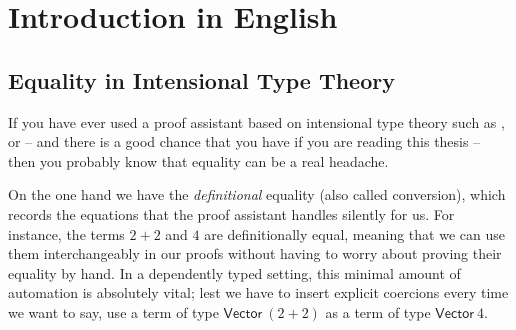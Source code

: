 \setchapterpreamble[u]{\margintoc}
\chapter{Introduction in English}



\section{Equality in Intensional Type Theory}

If you have ever used a proof assistant based on intensional type theory such as
\Coq, \Agda or {\Lean} -- and there is a good chance that you have if you are 
reading this thesis -- then you probably know that equality can be a real headache.

On the one hand we have the \emph{definitional} equality (also called conversion), which records the 
equations that the proof assistant handles silently for us.
% 
% 
For instance, the terms \( 2+2 \) and \( 4 \) are definitionally equal, meaning that we 
can use them interchangeably in our proofs without having to worry about 
proving their equality by hand.
% 
In a dependently typed setting, this minimal amount of automation is absolutely vital; 
lest we have to insert explicit coercions every time we want to say, use a term 
of type \( \mathsf{Vector}\ (2+2) \) as a term of type \( \mathsf{Vector}\ 4 \).


